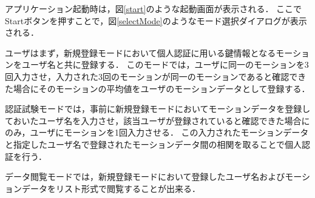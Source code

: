 \documentclass[11pt]{jreport}
\begin{document}
    アプリケーション起動時は，図\ref{start}のような起動画面が表示される．
    ここでStartボタンを押すことで，図\ref{selectMode}のようなモード選択ダイアログが表示される．

    ユーザはまず，新規登録モードにおいて個人認証に用いる鍵情報となるモーションをユーザ名と共に登録する．
    このモードでは，ユーザに同一のモーションを3回入力させ，入力された3回のモーションが同一のモーションであると確認できた場合にそのモーションの平均値をユーザのモーションデータとして登録する．

    認証試験モードでは，事前に新規登録モードにおいてモーションデータを登録しておいたユーザ名を入力させ，該当ユーザが登録されていると確認できた場合にのみ，ユーザにモーションを1回入力させる．
    この入力されたモーションデータと指定したユーザ名で登録されたモーションデータ間の相関を取ることで個人認証を行う．

    データ閲覧モードでは，新規登録モードにおいて登録したユーザ名およびモーションデータをリスト形式で閲覧することが出来る．
\end{document}
